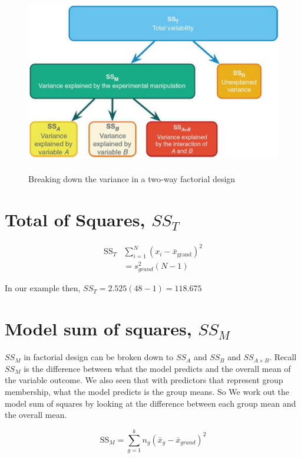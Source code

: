 \documentclass[a4paper, 12pt]{book}
\begin{document}
\begin{figure}[ht]
	\includegraphics[width=1\textwidth,height=80mm]{Chapter 14 GLM 3 Factorial Designs/SSsubdivision.PNG}
	\caption{Breaking down the variance in a two-way factorial design}
\end{figure}

\section{Total of Squares, $SS_T$}

\begin{equation}
\begin{split}
\text{SS}_T & \sum^N_{i=1}(x_i - \bar{x}_{\text{grand}})^2\\
&= s^2_{grand}(N-1) 
\end{split}
\end{equation}

In our example then, $SS_T = 2.525(48 - 1) = 118.675$

\section{Model sum of squares, $SS_M$}
$SS_M$ in factorial design can be broken down to $SS_A$ and $SS_B$ and $SS_{A \times B}$. 
Recall $SS_M$ is the difference between what the model predicts and the overall mean of the variable outcome. We also seen that with predictors that represent group membership, what the model predicts is the group means. So We work out the model sum of squares by looking at the difference between each group mean and the overall mean. 

\begin{equation}
\text{SS}_M = \sum^k_{g=1} n_g(\bar{x}_g - \bar{x}_{grand})^2
\end{equation}
\end{document}
